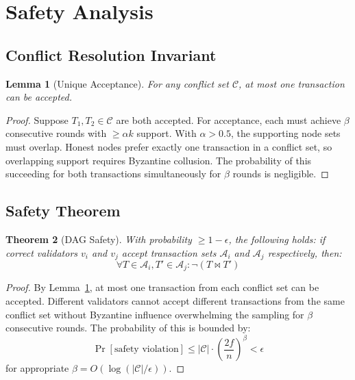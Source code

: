 \documentclass[11pt,a4paper]{article}
\newtheorem{theorem}{Theorem}
\newtheorem{lemma}[theorem]{Lemma}
\begin{document}
\section{Safety Analysis}

\subsection{Conflict Resolution Invariant}

\begin{lemma}[Unique Acceptance]
\label{lem:unique-accept}
For any conflict set $\mathcal{C}$, at most one transaction can be accepted.
\end{lemma}

\begin{proof}
Suppose $T_1, T_2 \in \mathcal{C}$ are both accepted. For acceptance, each must achieve $\beta$ consecutive rounds with $\geq \alpha k$ support. With $\alpha > 0.5$, the supporting node sets must overlap. Honest nodes prefer exactly one transaction in a conflict set, so overlapping support requires Byzantine collusion. The probability of this succeeding for both transactions simultaneously for $\beta$ rounds is negligible.
\end{proof}

\subsection{Safety Theorem}

\begin{theorem}[DAG Safety]
\label{thm:dag-safety}
With probability $\geq 1 - \epsilon$, the following holds: if correct validators $v_i$ and $v_j$ accept transaction sets $\mathcal{A}_i$ and $\mathcal{A}_j$ respectively, then:
\begin{equation}
\forall T \in \mathcal{A}_i, T' \in \mathcal{A}_j : \neg(T \bowtie T')
\end{equation}
\end{theorem}

\begin{proof}
By Lemma~\ref{lem:unique-accept}, at most one transaction from each conflict set can be accepted. Different validators cannot accept different transactions from the same conflict set without Byzantine influence overwhelming the sampling for $\beta$ consecutive rounds. The probability of this is bounded by:
\begin{equation}
\Pr[\text{safety violation}] \leq |\mathcal{C}| \cdot \left(\frac{2f}{n}\right)^{\beta} < \epsilon
\end{equation}
for appropriate $\beta = O(\log(|\mathcal{C}|/\epsilon))$.
\end{proof}
\end{document}
